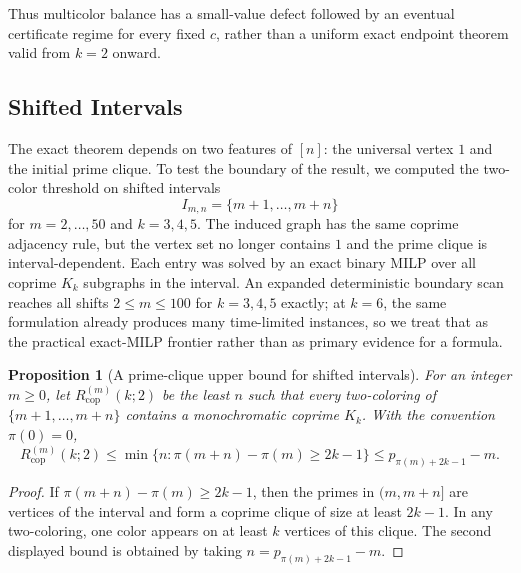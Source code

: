 \documentclass[11pt]{article}
\theoremstyle{plain}
\newtheorem{proposition}[theorem]{Proposition}
\theoremstyle{definition}
\theoremstyle{remark}
\begin{document}
Thus multicolor balance has a small-value defect followed by an eventual
certificate regime for every fixed $c$, rather than a uniform exact endpoint
theorem valid from $k=2$ onward.

\subsection{Shifted Intervals}

The exact theorem depends on two features of $[n]$: the universal vertex
$1$ and the initial prime clique.  To test the boundary of the result, we
computed the two-color threshold on shifted intervals
\[
  I_{m,n}=\{m+1,\ldots,m+n\}
\]
for $m=2,\ldots,50$ and $k=3,4,5$.  The induced graph has the same coprime
adjacency rule, but the vertex set no longer contains $1$ and the prime
clique is interval-dependent.  Each entry was solved by an exact binary MILP
over all coprime $K_k$ subgraphs in the interval.
An expanded deterministic boundary scan reaches all shifts $2\le m\le100$ for
$k=3,4,5$ exactly; at $k=6$, the same formulation already produces many
time-limited instances, so we treat that as the practical exact-MILP frontier
rather than as primary evidence for a formula.

\begin{proposition}[A prime-clique upper bound for shifted intervals]
\label{prop:shifted-upper}
For an integer $m\ge0$, let $R_{\mathrm{cop}}^{(m)}(k;2)$ be the least $n$ such that
every two-coloring of $\{m+1,\ldots,m+n\}$ contains a monochromatic coprime
$K_k$.  With the convention $\pi(0)=0$,
\[
  R_{\mathrm{cop}}^{(m)}(k;2)
  \le
  \min\{n:\pi(m+n)-\pi(m)\ge 2k-1\}
  \le p_{\pi(m)+2k-1}-m .
\]
\end{proposition}

\begin{proof}
If $\pi(m+n)-\pi(m)\ge 2k-1$, then the primes in $(m,m+n]$ are vertices of
the interval and form a coprime clique of size at least $2k-1$.  In any
two-coloring, one color appears on at least $k$ vertices of this clique.  The
second displayed bound is obtained by taking
$n=p_{\pi(m)+2k-1}-m$.
\end{proof}
\end{document}
